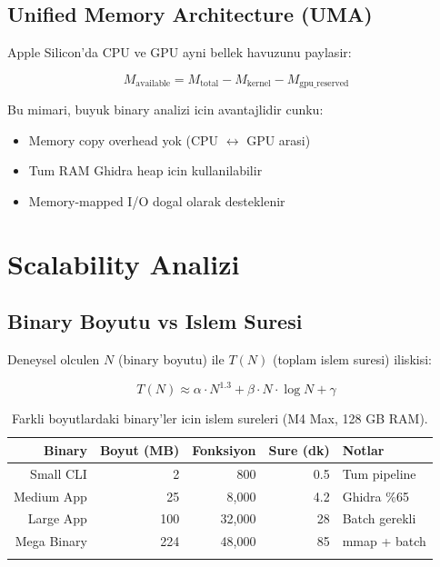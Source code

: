 \subsection{Unified Memory Architecture (UMA)}

Apple Silicon'da CPU ve GPU ayni bellek havuzunu paylasir:

\begin{equation}
  M_{\text{available}} = M_{\text{total}} - M_{\text{kernel}} - M_{\text{gpu\_reserved}}
  \label{eq:uma-memory}
\end{equation}

Bu mimari, buyuk binary analizi icin avantajlidir cunku:
\begin{itemize}
  \item Memory copy overhead yok (CPU $\leftrightarrow$ GPU arasi)
  \item Tum RAM Ghidra heap icin kullanilabilir
  \item Memory-mapped I/O dogal olarak desteklenir
\end{itemize}


\section{Scalability Analizi}
\label{sec:scalability}

\subsection{Binary Boyutu vs Islem Suresi}

Deneysel olculen $N$ (binary boyutu) ile $T(N)$ (toplam islem suresi)
iliskisi:

\begin{equation}
  T(N) \approx \alpha \cdot N^{1.3} + \beta \cdot N \cdot \log N + \gamma
  \label{eq:empirical-scaling}
\end{equation}

\begin{longtable}{rrrrl}
\toprule
\textbf{Binary} & \textbf{Boyut (MB)} & \textbf{Fonksiyon} & \textbf{Sure (dk)} & \textbf{Notlar} \\
\midrule
\endhead
Small CLI & 2 & 800 & 0.5 & Tum pipeline \\
Medium App & 25 & 8{,}000 & 4.2 & Ghidra \%65 \\
Large App & 100 & 32{,}000 & 28 & Batch gerekli \\
Mega Binary & 224 & 48{,}000 & 85 & mmap + batch \\
\bottomrule
\caption{Farkli boyutlardaki binary'ler icin islem sureleri (M4 Max, 128 GB RAM).}
\label{tab:scaling-empirical}
\end{longtable}

